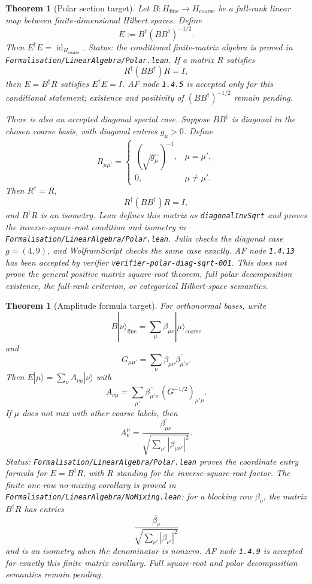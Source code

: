 \documentclass[11pt]{article}
\newtheorem{theorem}[definition]{Theorem}
\begin{document}
\begin{theorem}[Polar section target]
Let \(B:H_{\mathrm{fine}}\to H_{\mathrm{coarse}}\) be a full-rank linear map
between finite-dimensional Hilbert spaces. Define
\[
E:=B^\dagger(BB^\dagger)^{-1/2}.
\]
Then \(E^\dagger E=\operatorname{id}_{H_{\mathrm{coarse}}}\). Status: the
conditional finite-matrix algebra is proved in
\texttt{Formalisation/LinearAlgebra/Polar.lean}. If a matrix \(R\) satisfies
\[
R^\dagger(BB^\dagger)R=I,
\]
then \(E=B^\dagger R\) satisfies \(E^\dagger E=I\). AF node \texttt{1.4.5}
is accepted only for this conditional statement; existence and positivity of
\((BB^\dagger)^{-1/2}\) remain pending.

There is also an accepted diagonal special case. Suppose \(BB^\dagger\) is
diagonal in the chosen coarse basis, with diagonal entries \(g_\mu>0\). Define
\[
R_{\mu\mu'}=
\begin{cases}
(\sqrt{g_\mu})^{-1}, & \mu=\mu',\\
0, & \mu\ne\mu'.
\end{cases}
\]
Then \(R^\dagger=R\),
\[
R^\dagger(BB^\dagger)R=I,
\]
and \(B^\dagger R\) is an isometry. Lean defines this matrix as
\texttt{diagonalInvSqrt} and proves the inverse-square-root condition and
isometry in \texttt{Formalisation/LinearAlgebra/Polar.lean}. Julia checks the
diagonal case \(g=(4,9)\), and WolframScript checks the same case exactly. AF
node \texttt{1.4.13} has been accepted by verifier
\texttt{verifier-polar-diag-sqrt-001}. This does not prove the general
positive matrix square-root theorem, full polar decomposition existence, the
full-rank criterion, or categorical Hilbert-space semantics.
\end{theorem}

\begin{theorem}[Amplitude formula target]
For orthonormal bases, write
\[
B|\nu\rangle_{\mathrm{fine}}
=\sum_\mu \beta_{\mu\nu}|\mu\rangle_{\mathrm{coarse}}
\]
and
\[
G_{\mu\mu'}=\sum_\nu
\beta_{\mu\nu}\overline{\beta_{\mu'\nu}}.
\]
Then \(E|\mu\rangle=\sum_\nu A_{\nu\mu}|\nu\rangle\) with
\[
A_{\nu\mu}=\sum_{\mu'}
\overline{\beta_{\mu'\nu}}\,(G^{-1/2})_{\mu'\mu}.
\]
If \(\mu\) does not mix with other coarse labels, then
\[
A_\nu^\mu=
\frac{\overline{\beta_{\mu\nu}}}
{\sqrt{\sum_{\nu'}|\beta_{\mu\nu'}|^2}}.
\]
Status: \texttt{Formalisation/LinearAlgebra/Polar.lean} proves the coordinate
entry formula for \(E=B^\dagger R\), with \(R\) standing for the
inverse-square-root factor. The finite one-row no-mixing corollary is proved
in \texttt{Formalisation/LinearAlgebra/NoMixing.lean}: for a blocking row
\(\beta_\nu\), the matrix \(B^\dagger R\) has entries
\[
\frac{\overline{\beta_\nu}}
{\sqrt{\sum_{\nu'}|\beta_{\nu'}|^2}}
\]
and is an isometry when the denominator is nonzero. AF node \texttt{1.4.9} is
accepted for exactly this finite matrix corollary. Full square-root and polar
decomposition semantics remain pending.
\end{theorem}
\end{document}
